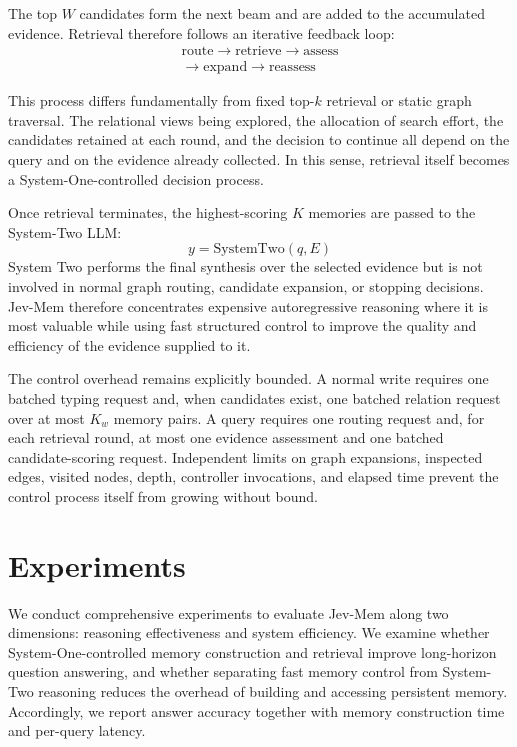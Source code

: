 \documentclass[11pt]{article}
\begin{document}
The top $W$ candidates form the next beam and are added to the accumulated evidence. Retrieval therefore follows an iterative feedback loop:
\begin{equation}
\begin{array}{c}
\text{route}
\rightarrow
\text{retrieve}
\rightarrow
\text{assess} \\
\rightarrow
\text{expand}
\rightarrow
\text{reassess}
\end{array}
\end{equation}

This process differs fundamentally from fixed top-$k$ retrieval or static graph traversal. The relational views being explored, the allocation of search effort, the candidates retained at each round, and the decision to continue all depend on the query and on the evidence already collected. In this sense, retrieval itself becomes a System-One-controlled decision process.

Once retrieval terminates, the highest-scoring $K$ memories are passed to the System-Two LLM:
\begin{equation}
y=
\mathrm{SystemTwo}(q,E)
\end{equation}
System Two performs the final synthesis over the selected evidence but is not involved in normal graph routing, candidate expansion, or stopping decisions. Jev-Mem therefore concentrates expensive autoregressive reasoning where it is most valuable while using fast structured control to improve the quality and efficiency of the evidence supplied to it.

The control overhead remains explicitly bounded. A normal write requires one batched typing request and, when candidates exist, one batched relation request over at most $K_w$ memory pairs. A query requires one routing request and, for each retrieval round, at most one evidence assessment and one batched candidate-scoring request. Independent limits on graph expansions, inspected edges, visited nodes, depth, controller invocations, and elapsed time prevent the control process itself from growing without bound.

\section{Experiments}
\label{experiments}
We conduct comprehensive experiments to evaluate Jev-Mem along two dimensions: reasoning effectiveness and system efficiency. We examine whether System-One-controlled memory construction and retrieval improve long-horizon question answering, and whether separating fast memory control from System-Two reasoning reduces the overhead of building and accessing persistent memory. Accordingly, we report answer accuracy together with memory construction time and per-query latency.
\end{document}
